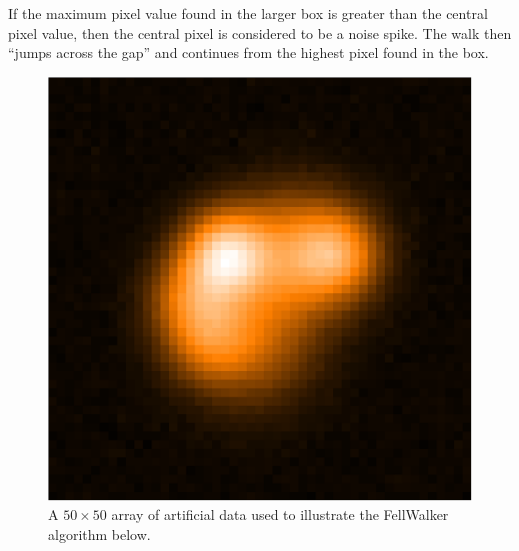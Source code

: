 \documentclass[final,authoryear,5p,times,twocolumn]{elsarticle}
\begin{document}
If the maximum pixel value found in the larger box is greater than the
central pixel value, then the central pixel is considered to be a noise
spike. The walk then ``jumps across the gap'' and continues from the
highest pixel found in the box.

\begin{figure}
\includegraphics[width=\columnwidth]{sim}
\caption{A $50\times50$ array of artificial data used to illustrate the
FellWalker algorithm below.}
\label{fig:sim}
\end{figure}
\end{document}
